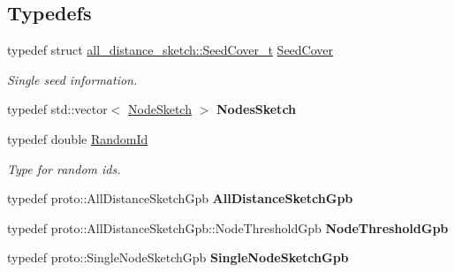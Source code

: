 \subsection*{Typedefs}
\begin{DoxyCompactItemize}
\item 
typedef struct \hyperlink{structall__distance__sketch_1_1SeedCover__t}{all\+\_\+distance\+\_\+sketch\+::\+Seed\+Cover\+\_\+t} \hyperlink{namespaceall__distance__sketch_a2c159e46ed1a101b68cb2b23a58c4129}{Seed\+Cover}
\begin{DoxyCompactList}\small\item\em Single seed information. \end{DoxyCompactList}\item 
\hypertarget{namespaceall__distance__sketch_aa6fb9f0cba2c34476603e744606c5d6a}{}typedef std\+::vector$<$ \hyperlink{classall__distance__sketch_1_1NodeSketch}{Node\+Sketch} $>$ {\bfseries Nodes\+Sketch}\label{namespaceall__distance__sketch_aa6fb9f0cba2c34476603e744606c5d6a}

\item 
\hypertarget{namespaceall__distance__sketch_a07dc7ca615a83c4e656f52297eda4bb4}{}typedef double \hyperlink{namespaceall__distance__sketch_a07dc7ca615a83c4e656f52297eda4bb4}{Random\+Id}\label{namespaceall__distance__sketch_a07dc7ca615a83c4e656f52297eda4bb4}

\begin{DoxyCompactList}\small\item\em Type for random ids. \end{DoxyCompactList}\item 
\hypertarget{namespaceall__distance__sketch_a5c92a8ad66531df4f1690f8fb4f96426}{}typedef proto\+::\+All\+Distance\+Sketch\+Gpb {\bfseries All\+Distance\+Sketch\+Gpb}\label{namespaceall__distance__sketch_a5c92a8ad66531df4f1690f8fb4f96426}

\item 
\hypertarget{namespaceall__distance__sketch_a670d91fdbfca59a9cd101180703f5349}{}typedef proto\+::\+All\+Distance\+Sketch\+Gpb\+::\+Node\+Threshold\+Gpb {\bfseries Node\+Threshold\+Gpb}\label{namespaceall__distance__sketch_a670d91fdbfca59a9cd101180703f5349}

\item 
\hypertarget{namespaceall__distance__sketch_a303e4823d16b1292aae19bffa3fcd302}{}typedef proto\+::\+Single\+Node\+Sketch\+Gpb {\bfseries Single\+Node\+Sketch\+Gpb}\label{namespaceall__distance__sketch_a303e4823d16b1292aae19bffa3fcd302}


\end{DoxyCompactItemize}
